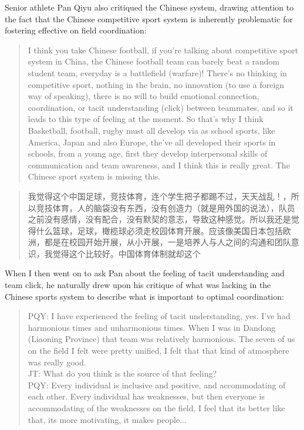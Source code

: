 \begin{CJK}{UTF8}{gbsn}
Senior athlete Pan Qiyu also critiqued the Chinese system, drawing attention to the fact that the Chinese competitive sport system is inherently problematic for fostering effective on field coordination:

\begin{quotation}
  I think you take Chinese football, if you’re talking about competitive sport system in China, the Chinese football team can barely beat a random student team, everyday is a battlefield (warfare)! There’s no thinking in competitive sport, nothing in the brain, no innovation (to use a foreign way of speaking), there is no will to build emotional connection, coordination, or tacit understanding (click) between teammates, and so it leads to this type of feeling at the moment.  So that's why I think Basketball, football, rugby must all develop via as school sports, like America, Japan and also Europe, the’ve all developed their sports in schools, from a young age, first they develop interpersonal skills of communication and team awareness, and I think this is really great.  The Chinese sport system is missing this.
\end{quotation}

\begin{quotation}
  我觉得这个中国足球，竞技体育，连个学生把子都踢不过，天天战乱！，所以竞技体育，人的脑袋没有东西，没有创造力（就是用外国的说法），队员之前没有感情，没有配合，没有默契的意志，导致这种感觉。所以我还是觉得什么篮球，足球，橄榄球必须走校园体育开展。应该像美国日本包括欧洲，都是在校园开始开展，从小开展，一是培养人与人之间的沟通和团队意识，我觉得这个比较好。中国体育体制就却这个
\end{quotation}

When I then went on to ask Pan about the feeling of tacit understanding and team click, he naturally drew upon his critique of what was lacking in the Chinese sports system to describe what is important to optimal coordination:


\begin{quotation}
  PQY: I have experienced the feeling of tacit understanding, yes. I've had harmonious times and unharmonious times. When I was in Dandong (Liaoning Province) that team was relatively harmonious.  The seven of us on the field I felt were pretty unified, I felt that that kind of atmosphere was really good. \\
  JT: What do you think is the source of that feeling? \\
  PQY: Every individual is inclusive and positive, and accommodating of each other. Every individual has weaknesses, but then everyone is accommodating of the weaknesses on the field, I feel that its better like that, its more motivating, it makes people...
\end{quotation}


\end{CJK}
